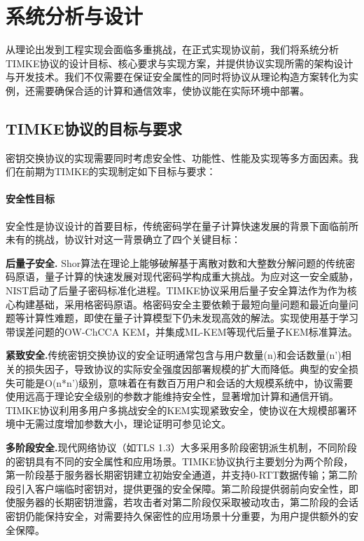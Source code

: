 \section{系统分析与设计}

从理论出发到工程实现会面临多重挑战，在正式实现协议前，我们将系统分析TIMKE协议的设计目标、核心要求与实现方案，并提供协议实现所需的架构设计与开发技术。我们不仅需要在保证安全属性的同时将协议从理论构造方案转化为实例，还需要确保合适的计算和通信效率，使协议能在实际环境中部署。

\subsection{TIMKE协议的目标与要求}
\label{appendix:timke_protocol_goals}
密钥交换协议的实现需要同时考虑安全性、功能性、性能及实现等多方面因素。我们在前期为TIMKE的实现制定如下目标与要求：

\paragraph{安全性目标}
安全性是协议设计的首要目标，传统密码学在量子计算快速发展的背景下面临前所未有的挑战，协议针对这一背景确立了四个关键目标：

\textbf{后量子安全.} Shor算法在理论上能够破解基于离散对数和大整数分解问题的传统密码原语，量子计算的快速发展对现代密码学构成重大挑战。为应对这一安全威胁，NIST启动了后量子密码标准化进程。TIMKE协议采用后量子安全算法作为作为核心构建基础，采用格密码原语。格密码安全主要依赖于最短向量问题和最近向量问题等计算性难题，即使在量子计算模型下仍未发现高效的解法。实现使用基于学习带误差问题的OW-ChCCA KEM，并集成ML-KEM等现代后量子KEM标准算法。

\textbf{紧致安全.}传统密钥交换协议的安全证明通常包含与用户数量(n)和会话数量(n')相关的损失因子，导致协议的实际安全强度因部署规模的扩大而降低。典型的安全损失可能是O(n*n')级别，意味着在有数百万用户和会话的大规模系统中，协议需要使用远高于理论安全级别的参数才能维持安全性，显著增加计算和通信开销。TIMKE协议利用多用户多挑战安全的KEM实现紧致安全，使协议在大规模部署环境中无需过度增加参数大小，理论证明可参见论文\cite{timke_2024}。
  
\textbf{多阶段安全.}现代网络协议（如TLS 1.3\cite{tls13_2018}）大多采用多阶段密钥派生机制，不同阶段的密钥具有不同的安全属性和应用场景。TIMKE协议执行主要划分为两个阶段，第一阶段基于服务器长期密钥建立初始安全通道，并支持0-RTT数据传输；第二阶段引入客户端临时密钥对，提供更强的安全保障。第二阶段提供弱前向安全性，即使服务器的长期密钥泄露，若攻击者对第二阶段仅采取被动攻击，第二阶段的会话密钥仍能保持安全，对需要持久保密性的应用场景十分重要，为用户提供额外的安全保障。
  
